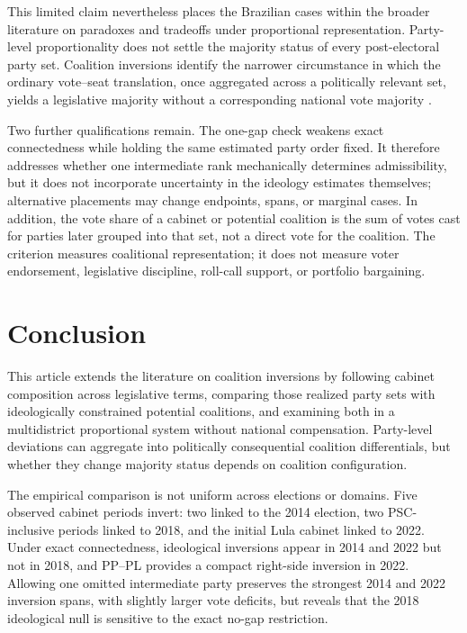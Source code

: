 \documentclass[11pt]{article}
\begin{document}
This limited claim nevertheless places the Brazilian cases within the broader
literature on paradoxes and tradeoffs under proportional representation. Party-level
proportionality does not settle the majority status of every post-electoral
party set. Coalition inversions identify the narrower circumstance in which the
ordinary vote--seat translation, once aggregated across a politically relevant
set, yields a legislative majority without a corresponding national vote
majority \parencite{van1993paradoxes,kurrild2008voting,
kaminski18_spoil_effec_propor_repres_system,
FlisGrofmanKaminski2025Introduction}.

Two further qualifications remain. The one-gap check weakens exact
connectedness while holding the same estimated party order fixed. It therefore
addresses whether one intermediate rank mechanically determines admissibility,
but it does not incorporate uncertainty in the ideology estimates themselves;
alternative placements may change endpoints, spans, or marginal cases. In
addition, the vote share of a cabinet or potential coalition is the sum of votes
cast for parties later grouped into that set, not a direct vote for the
coalition. The criterion measures coalitional representation; it does not
measure voter endorsement, legislative discipline, roll-call support, or
portfolio bargaining.


\section{Conclusion}

This article extends the literature on coalition inversions by following
cabinet composition across legislative terms, comparing those realized party
sets with ideologically constrained potential coalitions, and examining both in
a multidistrict proportional system without national compensation. Party-level
deviations can aggregate into politically consequential coalition
differentials, but whether they change majority status depends on coalition
configuration.

The empirical comparison is not uniform across elections or domains. Five
observed cabinet periods invert: two linked to the 2014 election, two
PSC-inclusive periods linked to 2018, and the initial Lula cabinet linked to
2022. Under exact connectedness, ideological inversions appear in 2014 and
2022 but not in 2018, and PP--PL provides a compact right-side inversion in
2022. Allowing one omitted intermediate party preserves the strongest 2014 and
2022 inversion spans, with slightly larger vote deficits, but reveals that the
2018 ideological null is sensitive to the exact no-gap restriction.
\end{document}
